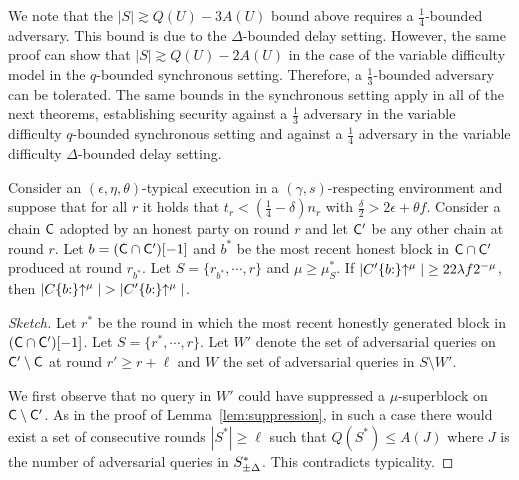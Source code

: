 \begin{remark}
  We note that the $|S| \gtrsim Q(U) - 3A(U)$ bound above requires a
  $\frac{1}{4}$-bounded adversary. This bound is due to the $\Delta$-bounded
  delay setting. However, the same proof can show that
  $|S| \gtrsim Q(U) - 2A(U)$ in the case of the variable difficulty model in
  the $q$-bounded synchronous setting. Therefore, a $\frac{1}{3}$-bounded
  adversary can be tolerated. The same bounds in the synchronous setting apply
  in all of the next theorems, establishing security against a $\frac{1}{3}$
  adversary in the variable difficulty $q$-bounded synchronous setting
  and against a $\frac{1}{4}$ adversary in the variable difficulty
  $\Delta$-bounded delay setting.
\end{remark}

\begin{theorem}\label{thm:varscp}
  Consider an $(\epsilon, \eta, \theta)$-typical execution in a
  $(\gamma, s)$-respecting environment and suppose that for all $r$ it holds
  that $t_r < (\frac{1}{4} - \delta)n_r$ with
  $\frac{\delta}{2} > 2\epsilon + \theta f$.
  Consider a chain $\mathsf{C}$ adopted by an honest party on round $r$ and let
  $\mathsf{C}'$ be any other chain at round $r$. Let $b =
  (\mathsf{C}\cap\mathsf{C}')[-1]$ and $b^*$ be the most recent honest block in
  $\mathsf{C}\cap\mathsf{C}'$ produced at round $r_{b^*}$. Let $S = \{ r_{b^*}, \cdots,
  r \}$ and $\mu \geq \mu^*_S$. If $|C'\{b{:}\}\negthickspace\uparrow^\mu| \geq 22\lambda
  f 2^{-\mu}$, then $|C\{b{:}\}\negthickspace\uparrow^\mu| >
  |C'\{b{:}\}\negthickspace\uparrow^\mu|$.
\end{theorem}
\begin{proof}[Sketch]
  Let $r^*$ be the round in which the most recent honestly generated block in
  $(\mathsf{C} \cap \mathsf{C}')[-1]$.
  Let $S = \{r^*, \cdots, r\}$. Let $W'$ denote the set of adversarial queries
  on $\mathsf{C}' \setminus \mathsf{C}$ at round $r' \geq r + \ell$ and
  $W$ the set of adversarial queries in $S \setminus W'$.

  We first observe that no query in $W'$ could have suppressed a
  $\mu$-superblock on $\mathsf{C}\setminus\mathsf{C}'$. As in the proof of
  Lemma~\ref{lem:suppression}, in such a case there would exist a set of consecutive
  rounds $|S^*| \geq \ell$ such that $Q(S^*) \leq A(J)$ where $J$ is the number
  of adversarial queries in $S^*_{\pm\Delta}$. This contradicts typicality.

\end{proof}

